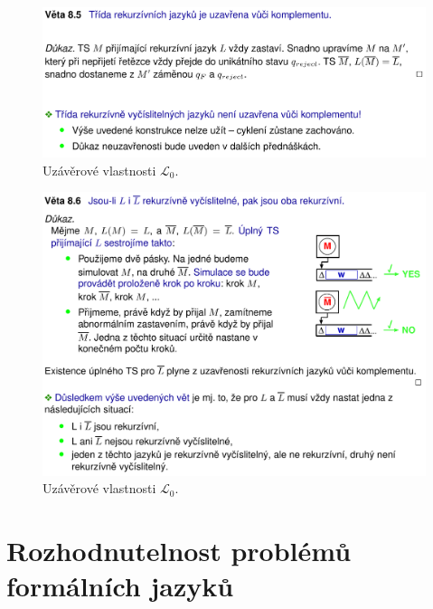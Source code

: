 \begin{figure}[H]
    \centering
    \includegraphics[width=1\linewidth]{uzaverove_vlasnosti_L0_04.pdf}
    \caption{Uzávěrové vlastnosti $\mathcal{L}_0$.}
\end{figure}

\begin{figure}[H]
    \centering
    \includegraphics[width=1\linewidth]{uzaverove_vlasnosti_L0_05.pdf}
    \caption{Uzávěrové vlastnosti $\mathcal{L}_0$.}
\end{figure}


\section{Rozhodnutelnost problémů formálních jazyků}

